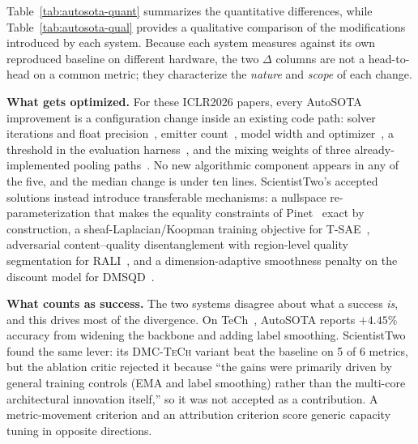 Table~\ref{tab:autosota-quant} summarizes the quantitative differences, while Table~\ref{tab:autosota-qual} provides a qualitative comparison of the modifications introduced by each system. Because each system measures against its own reproduced baseline on different hardware, the two $\Delta$ columns are not a head-to-head on a common metric; they characterize the \emph{nature} and \emph{scope} of each change.


\textbf{What gets optimized.}
For these ICLR2026 papers, every AutoSOTA improvement is a configuration change inside an existing code path: solver
iterations and float precision~\citep{grontas2026pinet}, emitter count~\citep{tjanaka2026discount},
model width and optimizer~\citep{yu2026decentralized}, a threshold in the evaluation
harness~\citep{bhalla2026temporal}, and the mixing weights of three already-implemented pooling
paths~\citep{zhao2026reasoning}. No new algorithmic component appears in any of the five, and the
median change is under ten lines. ScientistTwo's accepted solutions instead introduce
transferable mechanisms: a nullspace re-parameterization that makes the equality constraints of
Pinet~\citep{grontas2026pinet} exact by construction, a sheaf-Laplacian/Koopman training
objective for T-SAE~\citep{bhalla2026temporal}, adversarial content--quality disentanglement
with region-level quality segmentation for RALI~\citep{zhao2026reasoning}, and a dimension-adaptive
smoothness penalty on the discount model for DMSQD~\citep{tjanaka2026discount}.

\noindent\textbf{What counts as success.}
The two systems disagree about what a success \emph{is}, and this drives
most of the divergence. On TeCh~\citep{yu2026decentralized}, AutoSOTA reports $+4.45\%$ accuracy
from widening the backbone and adding label smoothing. ScientistTwo found the same lever: its
\textsc{DMC-TeCh} variant beat the baseline on 5 of 6 metrics, but the ablation critic rejected
it because ``the gains were primarily driven by general training controls (EMA and label
smoothing) rather than the multi-core architectural innovation itself,'' so it was not accepted
as a contribution. A metric-movement criterion and an attribution criterion score generic
capacity tuning in opposite directions.

